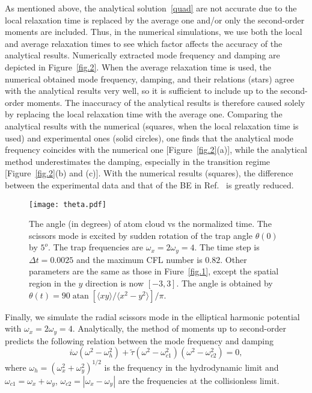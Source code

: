 As mentioned above, the analytical solution~\eqref{quad} are not accurate due to the local relaxation time is replaced by the average one and/or only the second-order moments are included. Thus, in the numerical simulations, we use both the local and average relaxation times to see which factor affects the accuracy of the analytical results. Numerically extracted mode frequency and damping are depicted in Figure~\ref{fig.2}. When the average relaxation time is used, the numerical obtained mode frequency, damping, and their relations (stars) agree with the analytical results very well, so it is sufficient to include up to the second-order moments. The inaccuracy of the analytical results is therefore caused solely by replacing the local relaxation time with the average one. Comparing the analytical results with the numerical (squares, when the local relaxation time is used) and experimental ones (solid circles), one finds that the analytical mode frequency coincides with the numerical one [Figure~\ref{fig.2}(a)], while the analytical method underestimates the damping, especially in the transition regime [Figure~\ref{fig.2}(b) and (c)]. With the numerical results (squares), the difference between the experimental data and that of the BE in Ref.~\cite{Riedl2008} is greatly reduced.


\begin{figure}[t]
\center
\texttt{[image: theta.pdf]} 
\caption[The angle (in degrees) of atom cloud vs the normalized time.]{The angle (in degrees) of atom cloud vs the normalized time. The scissors mode is excited by sudden rotation of the trap angle $\theta(0)$ by $5^o$. The trap frequencies are $\omega_x=2\omega_y=4$. The time step is $\Delta t=0.0025$ and the maximum CFL number is $0.82$. Other parameters are the same as those in Fiure~\ref{fig.1}, except the spatial region in the $y$ direction is now $[-3,3]$. The angle is obtained by $\theta(t)=90\operatorname{atan}[\langle xy\rangle/\langle x^2-y^2\rangle]/\pi$. } \label{theta}
\end{figure}


Finally, we simulate the radial scissors mode in the elliptical harmonic potential with $\omega_x=2\omega_y=4$. Analytically, the method of moments up to second-order predicts the following relation between the mode frequency and damping~\cite{Bruun2007}
\begin{equation}\label{scissors}
    {i\omega}(\omega^2-\omega_h^2)
   +{\widetilde{\tau}}(\omega^2-\omega_{c1}^2)(\omega^2-\omega_{c2}^2)=0,
\end{equation}
where $\omega_h=(\omega_x^2+\omega_y^2)^{1/2}$ is the frequency in the hydrodynamic limit and $\omega_{c1}=\omega_x+\omega_y$, $\omega_{c2}=|\omega_x-\omega_y|$ are the frequencies at the collisionless limit.


